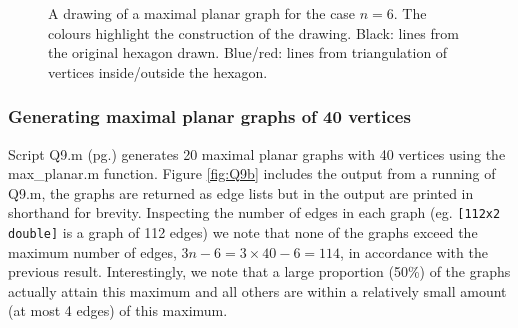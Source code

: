 \documentclass[a4paper]{article}
\begin{document}
\begin{figure}[H]
    \centering
    \caption{A drawing of a maximal planar graph for the case $n=6$. The colours highlight the construction of the drawing. Black: lines from the original hexagon drawn. Blue/red: lines from triangulation of vertices inside/outside the hexagon.}
    \label{fig:Q9a}
\end{figure}

\subsubsection*{Generating maximal planar graphs of 40 vertices}

Script Q9.m (pg.\pageref{PQ9}) generates 20 maximal planar graphs with 40 vertices using the max\_planar.m function. Figure \ref{fig:Q9b} includes the output from a running of Q9.m, the graphs are returned as edge lists but in the output are printed in shorthand for brevity. Inspecting the number of edges in each graph (eg. \texttt{[112x2 double]} is a graph of 112 edges) we note that none of the graphs exceed the maximum number of edges, $3n-6=3\times40-6=114$, in accordance with the previous result. Interestingly, we note that a large proportion (50\%) of the graphs actually attain this maximum and all others are within a relatively small amount (at most 4 edges) of this maximum.
\end{document}
